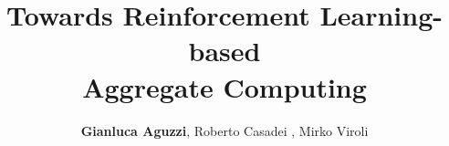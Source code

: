 

\title{
  {\fontfamily{\playfairfamily}\selectfont
    Towards Reinforcement Learning-based \\ Aggregate Computing
  }
}
\author[G.Aguzzi]{
  \textbf{Gianluca Aguzzi}, Roberto Casadei , Mirko Viroli 
}
